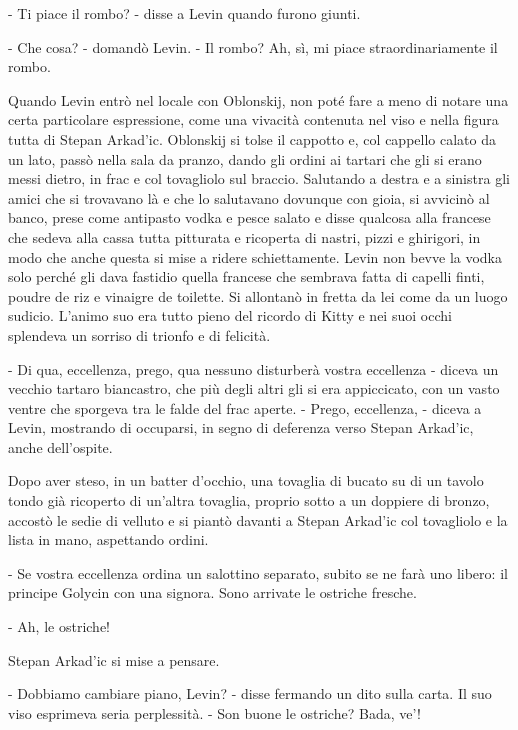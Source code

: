- Ti piace il rombo? - disse a Levin quando furono giunti. 

- Che cosa? - domandò Levin. - Il rombo? Ah, sì, mi piace straordinariamente il rombo. 
\enlargethispage{1\baselineskip}

\label{x} 

Quando Levin entrò nel locale con Oblonskij, non poté fare a meno di notare una certa particolare espressione, come una vivacità contenuta nel viso e nella figura tutta di Stepan Arkad'ic. Oblonskij si tolse il cappotto e, col cappello calato da un lato, passò nella sala da pranzo, dando gli ordini ai tartari che gli si erano messi dietro, in frac e col tovagliolo sul braccio. Salutando a destra e a sinistra gli amici che si trovavano là e che lo salutavano dovunque con gioia, si avvicinò al banco, prese come antipasto vodka e pesce salato e disse qualcosa alla francese che sedeva alla cassa tutta pitturata e ricoperta di nastri, pizzi e ghirigori, in modo che anche questa si mise a ridere schiettamente. Levin non bevve la vodka solo perché gli dava fastidio quella francese che sembrava fatta di capelli finti, poudre de riz e vinaigre de toilette. Si allontanò in fretta da lei come da un luogo sudicio. L'animo suo era tutto pieno del ricordo di Kitty e nei suoi occhi splendeva un sorriso di trionfo e di felicità. 

- Di qua, eccellenza, prego, qua nessuno disturberà vostra eccellenza - diceva un vecchio tartaro biancastro, che più degli altri gli si era appiccicato, con un vasto ventre che sporgeva tra le falde del frac aperte. - Prego, eccellenza, - diceva a Levin, mostrando di occuparsi, in segno di deferenza verso Stepan Arkad'ic, anche dell'ospite. 

Dopo aver steso, in un batter d'occhio, una tovaglia di bucato su di un tavolo tondo già ricoperto di un'altra tovaglia, proprio sotto a un doppiere di bronzo, accostò le sedie di velluto e si piantò davanti a Stepan Arkad'ic col tovagliolo e la lista in mano, aspettando ordini. 

- Se vostra eccellenza ordina un salottino separato, subito se ne farà uno libero: il principe Golycin con una signora. Sono arrivate le ostriche fresche. 

- Ah, le ostriche! 

Stepan Arkad'ic si mise a pensare. 

- Dobbiamo cambiare piano, Levin? - disse fermando un dito sulla carta. Il suo viso esprimeva seria perplessità. - Son buone le ostriche? Bada, ve'! 

